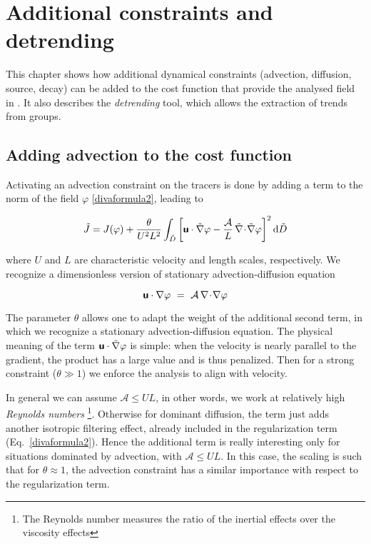 \chapter{Additional constraints and detrending\label{chap:advection}}

This chapter shows how additional dynamical constraints (advection, diffusion, source, decay) can be added to the cost function that provide the analysed field in \diva. It also describes the \textit{detrending} tool, which allows the extraction of trends from groups.

\minitoc


\section{Adding advection to the cost function}

Activating an advection constraint on the tracers is done by adding a term to the norm of the field $\varphi$ \eqref{divaformula2}, leading to

\begin{equation}
\tilde{J}= J(\varphi) + \frac{\theta}{U^2 L^2} \int_{\tilde{D}}\left[
\mbox{\boldmath $ \protect\mathsf{u} $} \cdot \tilde{\nabla} \varphi
- \frac{\mathcal{A}}{L} \, \tilde{\nabla}\! \cdot\! \tilde{\nabla}\varphi
\right]^2 \mbox{d} \tilde{D}
\end{equation}

where $U$ and $L$ are characteristic velocity and length scales, respectively. We recognize a dimensionless version of stationary advection-diffusion equation

\begin{equation}
\mbox{\boldmath $ \protect\mathsf{u} $} \cdot {\nabla} \varphi
~=~ \mathcal{A}  \, {\nabla}\! \cdot\! {\nabla}\varphi 
\end{equation}

The parameter $\theta$ allows one to adapt the weight of the additional second term, in which we recognize a stationary advection-diffusion equation. The physical meaning of the term $\mbox{\boldmath $ \protect\mathsf{u} $} \cdot \tilde{\nabla} \varphi$ is simple: when the velocity is nearly parallel to the gradient, the product has a large value and is thus penalized. Then for a strong constraint ($\theta\gg 1$) we enforce the analysis to align with velocity.

In general we can assume $\mathcal{A} \le U L$, in other words, we work at relatively high \textit{Reynolds numbers} \footnote{The Reynolds number measures the ratio of the inertial effects over the viscosity effects}. Otherwise for dominant diffusion, the term just adds another isotropic filtering effect, already included in the regularization term (Eq.~\ref{divaformula2}). Hence the additional term is really interesting only for situations dominated by advection, with $\mathcal{A} \le U L$. In this case, the scaling is such that for $\theta\approx 1$, the advection constraint has a similar importance with respect to the regularization term.

